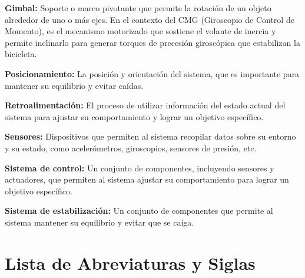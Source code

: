 \documentclass[12pt,letterpaper]{report}
\begin{document}
\vspace{2pt}
\noindent\textbf{Gimbal:} Soporte o marco pivotante que permite la rotación de un objeto alrededor de uno o más ejes. En el contexto del CMG (Giroscopio de Control de Momento), es el mecanismo motorizado que sostiene el volante de inercia y permite inclinarlo para generar torques de precesión giroscópica que estabilizan la bicicleta.

\vspace{2pt}
\noindent\textbf{Posicionamiento:} La posición y orientación del sistema, que es importante para mantener su equilibrio y evitar caídas.

\vspace{2pt}
\noindent\textbf{Retroalimentación:} El proceso de utilizar información del estado actual del sistema para ajustar su comportamiento y lograr un objetivo específico.

\vspace{2pt}
\noindent\textbf{Sensores:} Dispositivos que permiten al sistema recopilar datos sobre su entorno y su estado, como acelerómetros, giroscopios, sensores de presión, etc.

\vspace{2pt}
\noindent\textbf{Sistema de control:} Un conjunto de componentes, incluyendo sensores y actuadores, que permiten al sistema ajustar su comportamiento para lograr un objetivo específico.

\vspace{2pt}
\noindent\textbf{Sistema de estabilización:} Un conjunto de componentes que permite al sistema mantener su equilibrio y evitar que se caiga.

\newpage
\chapter*{Lista de Abreviaturas y Siglas}
\end{document}
